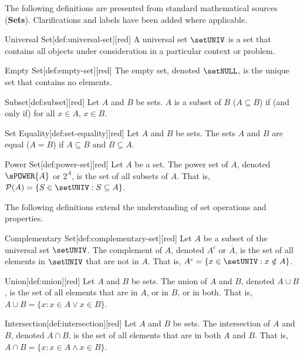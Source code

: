 
The following definitions are presented from standard mathematical sources (\textbf{Sets}).
Clarifications and labels have been added where applicable.

\begin{define}{Universal Set}[def:universal-set][red]
  A universal set $\setUNIV$ is a set that contains all objects under consideration in a particular context or problem.
\end{define}

\begin{define}{Empty Set}[def:empty-set][red]
  The empty set, denoted $\setNULL$, is the unique set that contains no elements.
\end{define}

\begin{define}{Subset}[def:subset][red]
  Let $A$ and $B$ be sets. $A$ is a subset of $B$ ($A \subseteq B$) if (and only if) for all $x \in A$, $x \in B$.
\end{define}

\begin{define}{Set Equality}[def:set-equality][red]
  Let $A$ and $B$ be sets. The sets $A$ and $B$ are equal ($A = B$) if $A \subseteq B$ and $B \subseteq A$.
\end{define}

\begin{define}{Power Set}[def:power-set][red]
  Let $A$ be a set. The power set of $A$, denoted $\sPOWER{A}$ or $2^A$, is the set of all subsets of $A$. That is, $\mathcal{P}(A) = \{S\in\setUNIV : S \subseteq A\}$.
\end{define}
The following definitions extend the understanding of set operations
and properties.


\begin{define}{Complementary Set}[def:complementary-set][red]
  Let $A$ be a subset of the universal set $\setUNIV$. The complement of $A$, denoted $A^c$ or $\overline{A}$, is the set of all elements in $\setUNIV$ that are not in $A$. That is, $A^c = \{x \in \setUNIV : x \notin A\}$.
\end{define}

\begin{define}{Union}[def:union][red]
  Let $A$ and $B$ be sets. The union of $A$ and $B$, denoted $A \cup B$, is the set of all elements that are in $A$, or in $B$, or in both. That is, $A \cup B = \{x : x \in A \lor x \in B\}$.
\end{define}

\begin{define}{Intersection}[def:intersection][red]
  Let $A$ and $B$ be sets. The intersection of $A$ and $B$, denoted $A \cap B$, is the set of all elements that are in both $A$ and $B$. That is, $A \cap B = \{x : x \in A \land x \in B\}$.
\end{define}

